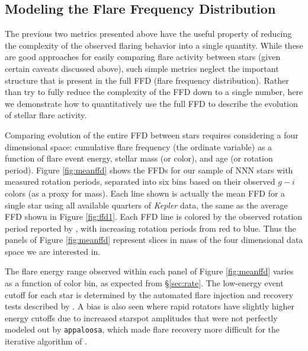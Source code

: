 \documentclass[preprint2]{aastex62}
\newcommand{\Kepler}{\textsl{Kepler}\xspace}
\begin{document}
\subsection{Modeling the Flare Frequency Distribution}
\label{sec:ffd}

The previous two metrics presented above have the useful property of reducing the complexity of the observed flaring behavior into a single quantity. While these are good approaches for easily comparing flare activity between stars (given certain caveats discussed above), such simple metrics neglect the important structure that is present in the full FFD (flare frequency distribution). Rather than try to fully reduce the complexity of the FFD down to a single number, here we demonstrate how to quantitatively use the full FFD to describe the evolution of stellar flare activity.


Comparing evolution of the entire FFD between stars requires considering a four dimensional space: cumulative flare frequency (the ordinate variable) as a function of flare event energy, stellar mass (or color), and age (or rotation period). 
Figure \ref{fig:meanffd} shows the FFDs for our sample of NNN stars with measured rotation periods, separated into six bins based on their observed $g-i$ colors (as a proxy for mass).
Each line shown is actually the mean FFD for a single star using all available quarters of \Kepler data, the same as the average FFD shown in Figure \ref{fig:ffd1}.
Each FFD line is colored by the observed rotation period reported by \citet{mcquillan2014}, with increasing rotation periods from red to blue. Thus the panels of Figure \ref{fig:meanffd} represent slices in mass of the four dimensional data space we are interested in. 

The flare energy range observed within each panel of Figure \ref{fig:meanffd} varies as a function of color bin, as expected from \S\ref{sec:rate}. The low-energy event cutoff for each star is determined by the automated flare injection and recovery tests described by \citet{davenport2016}. A bias is also seen where rapid rotators have slightly higher energy cutoffs due to increased starspot amplitudes that were not perfectly modeled out by {\tt appaloosa}, which made flare recovery more difficult for the iterative algorithm of \citet{davenport2016}.
\end{document}

